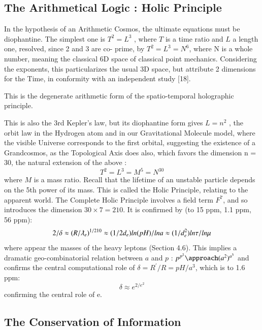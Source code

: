 \documentclass[twoside,draft]{article}
\begin{document}
\begin{sloppypar}
{\subsection{The Arithmetical Logic : Holic Principle}

In the hypothesis of an Arithmetic Cosmos, the ultimate equations must be diophantine. The
simplest one is $T^{2} = L^{3}$ , where $T$ is a time ratio and $L$ a length one, resolved, since 2 and 3 are co-
prime, by $T^{2} = L^{3} = N^{6}$, where N is a whole number, meaning the classical 6D space of classical point mechanics. Considering the exponents, this particularizes the usual 3D space, but attribute 2 dimensions for the Time, in conformity with an independent study [18].

This is the degenerate arithmetic form of the spatio-temporal holographic principle.

This is also the 3rd Kepler's law, but its diophantine form gives $L = n^{2}$ , the orbit law in the Hydrogen atom and in our
Gravitational Molecule model, where the visible Universe corresponds to the first orbital,
suggesting the existence of a Grandcosmos, as the Topological Axis does also, which favors the
dimension n = 30, the natural extension of the above :
\begin{equation}
T^{2} = L^{3} = M^{5} = N^{30}
\end{equation}
where $M$ is a mass ratio. Recall that the lifetime of an unstable particle depends on the 5th power of its mass. This is called the Holic Principle, relating to the apparent world. The Complete Holic
Principle involves a field term $F^{7}$, and so introduces the dimension $30 \times 7 = 210$. It is confirmed by (to 15 ppm, 1.1 ppm, 56 ppm):
\begin{equation}
2/\delta \approx (R/\lambdabar_{e})^{1/210} \approx (1/2d_{e}) ln(pH)/lna \approx (1/d_e^{2})ln\tau/ln\mu
\end{equation}
where appear the masses of the heavy leptons (Section 4.6). This implies a dramatic geo-combinatorial relation between $a$ and $p$ : $p^{p^{2}} \approach (a^{2})^{a^{3}}$ and confirms the central computational role of $\delta = R^{\prime}/R = pH/a^{3}$, which is to 1.6 ppm:
\begin{equation}
\delta \approx e^{2/e^2} 
\end{equation}
confirming the central role of e.


\subsection{The Conservation of Information}

}
\end{sloppypar}
\end{document}
